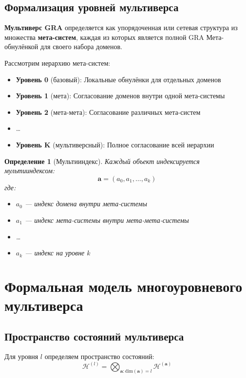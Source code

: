 \documentclass[12pt,a4paper]{article}
\newtheorem{definition}[theorem]{Определение}
\newcommand{\calH}{\mathcal{H}}
\newcommand{\bfa}{\mathbf{a}}
\begin{document}
\subsection{Формализация уровней мультиверса}

\textbf{Мультиверс GRA} определяется как упорядоченная или сетевая структура из множества \textbf{мета-систем}, каждая из которых является полной GRA Мета-обнулёнкой для своего набора доменов.

Рассмотрим иерархию мета-систем:
\begin{itemize}
    \item \textbf{Уровень 0} (базовый): Локальные обнулёнки для отдельных доменов
    \item \textbf{Уровень 1} (мета): Согласование доменов внутри одной мета-системы
    \item \textbf{Уровень 2} (мета-мета): Согласование различных мета-систем
    \item \ldots
    \item \textbf{Уровень K} (мультиверсный): Полное согласование всей иерархии
\end{itemize}

\begin{definition}[Мультииндекс]
Каждый объект индексируется мультииндексом:
\begin{equation}
\bfa = (a_0, a_1, \dots, a_k)
\end{equation}
где:
\begin{itemize}
    \item $a_0$ --- индекс домена внутри мета-системы
    \item $a_1$ --- индекс мета-системы внутри мета-мета-системы
    \item \ldots
    \item $a_k$ --- индекс на уровне $k$
\end{itemize}
\end{definition}

\section{Формальная модель многоуровневого мультиверса}

\subsection{Пространство состояний мультиверса}

Для уровня $l$ определяем пространство состояний:
\begin{equation}
\calH^{(l)} = \bigotimes_{\bfa: \text{dim}(\bfa)=l} \calH^{(\bfa)}
\end{equation}
\end{document}
